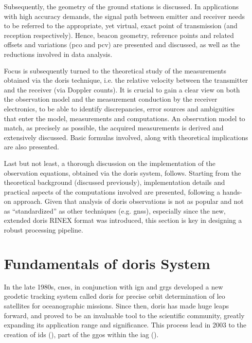 Subsequently, the geometry of the ground stations is discussed. In applications  
with high accuracy demands, the signal path between emitter and receiver  
needs to be referred to the appropriate, yet virtual, exact point of transmission 
(and reception respectively). Hence, beacon geometry, reference points and related 
offsets and variations (\gls{pco} and \gls{pcv}) are presented and discussed, as 
well as the reductions involved in data analysis.

Focus is subsequently turned to the theoretical study of the measurements obtained via the 
\gls{doris} technique, i.e. the relative velocity between the transmitter and the 
receiver (via Doppler counts). It is crucial to gain a clear view on both the 
observation model and the measurement conduction by the receiver electronics, to 
be able to identify discrepancies, error sources and ambiguities that enter the model, 
measurements and computations. An observation model to match, as precisely as possible, 
the acquired measurements is derived and extensively discussed. Basic formulas 
involved, along with theoretical implications are also presented.

Last but not least, a thorough discussion on the implementation of the observation 
equations, obtained via the \gls{doris} system, follows. Starting from the theoretical 
background (discussed previously), implementation details and practical aspects of the 
computations involved are presented, following a hands-on approach. Given that analysis 
of \gls{doris} observations is not as popular and not as ``standardized'' as other 
techniques (e.g. \gls{gnss}), especially since the new, extended \gls{doris} RINEX 
format was introduced, this section is key in designing a robust processing pipeline.

\section{Fundamentals of \gls{doris} System}\label{sec:doris-system-fundamentals}
In the late 1980s, \gls{cnes}, in conjunction with \gls{ign} and \gls{grgs} developed 
a new geodetic tracking system called \gls{doris} for precise orbit determination 
of \gls{leo} satellites for oceanographic missions. Since then, \gls{doris} has 
made huge leaps forward, and proved to be an invaluable tool to the scientific community, 
greatly expanding its application range and significance. This process lead in 
2003 to the creation of \gls{ids} (\cite{Willis2016}), part of the \gls{ggos} 
within the \gls{iag} (\cite{Willis2006}). 

